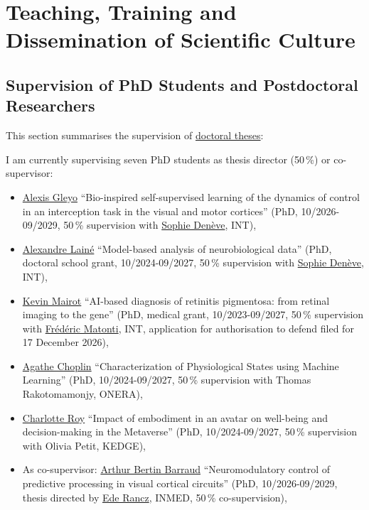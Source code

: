 \documentclass[10pt,english,a4paper,oneside]{article}%
\begin{document}
\section{Teaching, Training and Dissemination of Scientific Culture}

\subsection{Supervision of PhD Students and Postdoctoral Researchers} %

This section summarises the supervision of \href{https://www.theses.fr/074493701}{doctoral theses}:

I am currently supervising seven PhD students as thesis director (50\,\%) or co-supervisor:

\begin{itemize}
	\item \href{https://laurentperrinet.github.io/author/alexis-gleyo/}{Alexis Gleyo} ``Bio-inspired self-supervised learning of the dynamics of control in an interception task in the visual and motor cortices'' (PhD, 10/2026-09/2029, 50\,\% supervision with \href{https://laurentperrinet.github.io/author/sophie-den%C3%A8ve/}{Sophie Denève}, INT),
	\item \href{https://laurentperrinet.github.io/author/alexandre-lain%C3%A9/}{Alexandre Lainé} ``Model-based analysis of neurobiological data'' (PhD, doctoral school grant, 10/2024-09/2027, 50\,\% supervision with \href{https://laurentperrinet.github.io/author/sophie-den%C3%A8ve/}{Sophie Denève}, INT),
	\item \href{https://laurentperrinet.github.io/author/kevin-mairot/}{Kevin Mairot} ``AI-based diagnosis of retinitis pigmentosa: from retinal imaging to the gene'' (PhD, medical grant, 10/2023-09/2027, 50\,\% supervision with \href{https://laurentperrinet.github.io/author/frederic-matonti/}{Frédéric Matonti}, INT, application for authorisation to defend filed for 17 December 2026),
	\item \href{https://laurentperrinet.github.io/author/agathe-choplin/}{Agathe Choplin} ``Characterization of Physiological States using Machine Learning'' (PhD, 10/2024-09/2027, 50\,\% supervision with Thomas Rakotomamonjy, ONERA),
	\item \href{https://laurentperrinet.github.io/author/charlotte-roy/}{Charlotte Roy} ``Impact of embodiment in an avatar on well-being and decision-making in the Metaverse'' (PhD, 10/2024-09/2027, 50\,\% supervision with Olivia Petit, KEDGE),
	\item As co-supervisor: \href{https://laurentperrinet.github.io/author/arthur-bertin-barraud/}{Arthur Bertin Barraud} ``Neuromodulatory control of predictive processing in visual cortical circuits'' (PhD, 10/2026-09/2029, thesis directed by \href{https://laurentperrinet.github.io/author/ede-rancz/}{Ede Rancz}, INMED, 50\,\% co-supervision),

\end{itemize}
\end{document}
